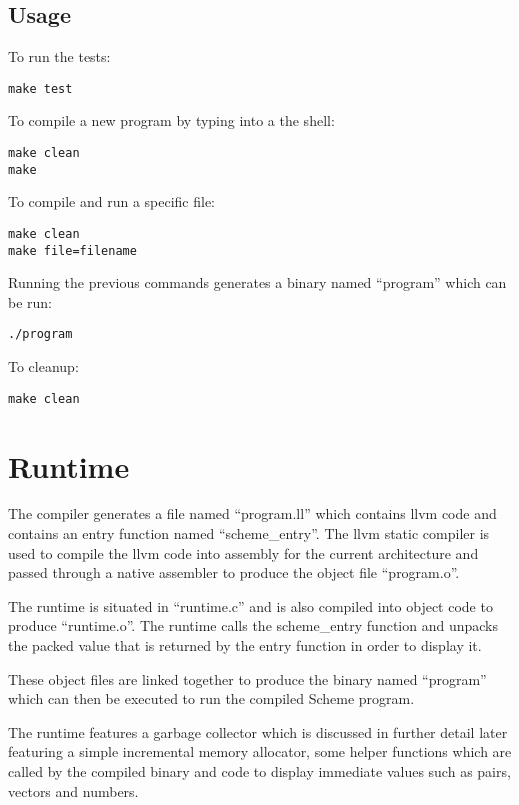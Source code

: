 \documentclass{article}
\begin{document}
\subsection{Usage}

To run the tests:

\begin{verbatim}
make test
\end{verbatim}

To compile a new program by typing into a the shell:

\begin{verbatim}
make clean
make
\end{verbatim}

To compile and run a specific file:

\begin{verbatim}
make clean
make file=filename
\end{verbatim}

Running the previous commands generates a binary named ``program'' which can be run:

\begin{verbatim}
./program
\end{verbatim}

To cleanup:

\begin{verbatim}
make clean
\end{verbatim}

\section{Runtime}

The compiler generates a file named ``program.ll'' which contains llvm code and contains an entry function named ``scheme\_entry''. The llvm static compiler is used to compile the llvm code into assembly for the current architecture and passed through a native assembler to produce the object file ``program.o''.

The runtime is situated in ``runtime.c'' and is also compiled into object code to produce ``runtime.o''. The runtime calls the scheme\_entry function and unpacks the packed value that is returned by the entry function in order to display it. 

These object files are linked together to produce the binary named ``program'' which can then be executed to run the compiled Scheme program.

The runtime features a garbage collector which is discussed in further detail later featuring a simple incremental memory allocator, some helper functions which are called by the compiled binary and code to display immediate values such as pairs, vectors and numbers.
\end{document}
